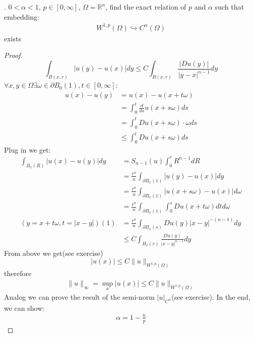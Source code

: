 \begin{exercise}.
$0<\alpha<1$, $p \in [0, \infty]$, $\Omega = \mathbb{R}^n$, find the exact relation of $p$ and $\alpha$ such that embedding:
\begin{align*}
	W^{1, p}(\Omega) \hookrightarrow C^{\alpha}(\Omega)
\end{align*}
exists
\begin{proof}
\begin{equation}
\int_{B(x, r)} |u(y) - u(x)|dy \leq C \int_{B(x, r)} \frac{|Du(y)|}{|y-x|^{n-1}}dy	
\end{equation}
$\forall x, y \in \Omega \exists \omega \in \partial B_0(1), t \in [0, \infty] $:
\begin{align*}
	u(x) - u(y) &= u(x) - u(x + t\omega) \\
	&= \int_0^t \frac{d}{ds} u(x + s\omega) ds \\
	&= \int_0^t D u(x + s\omega) \cdot \omega ds\\
	&\leq \int_0^t Du (x + s\omega) ds
\end{align*}
Plug in we get:
\begin{align*}
	\int_{B_x(R)}| u(x) - u(y)|dy &= S_{n -1}(u) \int_0^r R^{n-1} dR\\
	&=  \frac{r^n}{n} \int_{\partial B_x(1)} |u(y) - u(x)| dy \\
	&= \frac{r^n}{n} \int_{\partial B_x(1)} |u(x + s\omega) - u(x)|d\omega \\
	&= \frac{r^n}{n} \int_{\partial B_x(1)} \int_0^s Du(x + t\omega)dt d\omega \\
	(y = x + t\omega, t = |x -y|)(1)
	&= \frac{r^n}{n}  \int_{\partial B_x(s)} Du(y)|x - y|^{-(n-1)}dy \\
	&\leq C \int_{B_x(r)} \frac{Du(y)}{|x - y|^{n-1}}dy
\end{align*}
From above we get(see exercise)
\begin{equation}
|u(x)| \leq C \|u\|_{W^{1,p}(\Omega)}	
\end{equation}
therefore
\begin{align*}
	\|u\|_\infty = \sup_x |u(x)| \leq C \|u\|_{W^{1, p}(\Omega)}
\end{align*}
Analog we can prove the result of the semi-norm $|u|_{C^{\alpha}}$(see exercise). In the end, we can show:
\begin{align*}
	\alpha = 1 - \frac{n}{p}
\end{align*} 
\end{proof}
\end{exercise}

